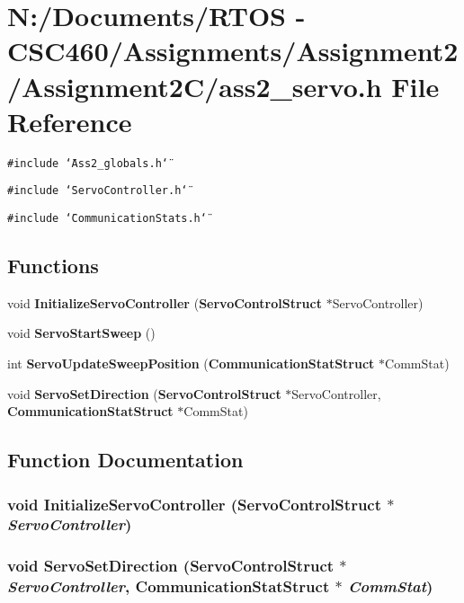 \section{N:/Documents/RTOS - CSC460/Assignments/Assignment2/Assignment2C/ass2\_\-servo.h File Reference}
\label{ass2__servo_8h}
{\tt \#include \char`\"{}Ass2\_\-globals.h\char`\"{}}\par
{\tt \#include \char`\"{}Servo\-Controller.h\char`\"{}}\par
{\tt \#include \char`\"{}Communication\-Stats.h\char`\"{}}\par
\subsection*{Functions}
\begin{CompactItemize}
\item 
void {\bf Initialize\-Servo\-Controller} ({\bf Servo\-Control\-Struct} $\ast$Servo\-Controller)
\item 
void {\bf Servo\-Start\-Sweep} ()
\item 
int {\bf Servo\-Update\-Sweep\-Position} ({\bf Communication\-Stat\-Struct} $\ast$Comm\-Stat)
\item 
void {\bf Servo\-Set\-Direction} ({\bf Servo\-Control\-Struct} $\ast$Servo\-Controller, {\bf Communication\-Stat\-Struct} $\ast$Comm\-Stat)
\end{CompactItemize}


\subsection{Function Documentation}
\subsubsection{\setlength{\rightskip}{0pt plus 5cm}void Initialize\-Servo\-Controller ({\bf Servo\-Control\-Struct} $\ast$ {\em Servo\-Controller})}\label{ass2__servo_8h_cbb2628a30fc95f252352877da2e7dbf}


\subsubsection{\setlength{\rightskip}{0pt plus 5cm}void Servo\-Set\-Direction ({\bf Servo\-Control\-Struct} $\ast$ {\em Servo\-Controller}, {\bf Communication\-Stat\-Struct} $\ast$ {\em Comm\-Stat})}\label{ass2__servo_8h_d4826c0168cf83085638ce210ca5dcbb}


